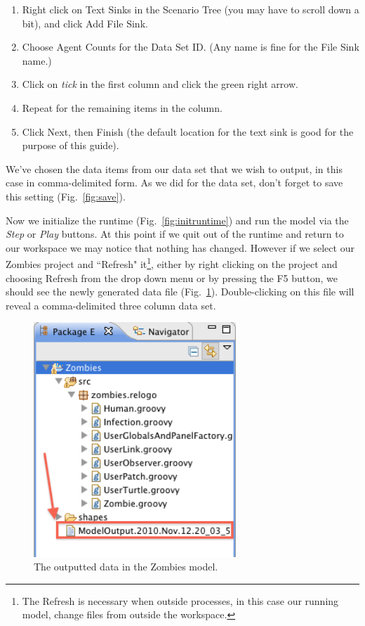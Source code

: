 \documentclass[11pt]{amsart}
\begin{document}
\begin{enumerate}
\item
Right click on Text Sinks in the Scenario Tree (you may have to scroll down a bit), and click Add File Sink.
\item
Choose Agent Counts for the Data Set ID. (Any name is fine for the File Sink name.)
\item
Click on \emph{tick} in the first column and click the green right arrow.
\item
Repeat for the remaining items in the column.
\item
Click Next, then Finish (the default location for the text sink is good for the purpose of this guide).
\end{enumerate}
We've chosen the data items from our data set that we wish to output, in this case in comma-delimited form. As we did for the data set, don't forget to save this setting (Fig.~\ref{fig:save}).

Now we initialize the runtime (Fig.~\ref{fig:initruntime}) and run the model via the \emph{Step} or \emph{Play} buttons. At this point if we quit out of the runtime and return to our workspace we may notice that nothing has changed. However if we select our Zombies project and ``Refresh" it\footnote{The Refresh is necessary when outside processes, in this case our running model, change files from outside the workspace.}, either by right clicking on the project and choosing Refresh from the drop down menu or by pressing the F5 button, we should see the newly generated data file (Fig.~\ref{fig:dataout}). Double-clicking on this file will reveal a comma-delimited three column data set.

\begin{figure}
\begin{center}
\vspace{.2in}
\centerline {
\includegraphics[width=3in]{GettingStartedImages/DataOut.png}
}
\caption{The outputted data in the Zombies model.}
\label{fig:dataout}
\end{center}
\end{figure}
\end{document}
